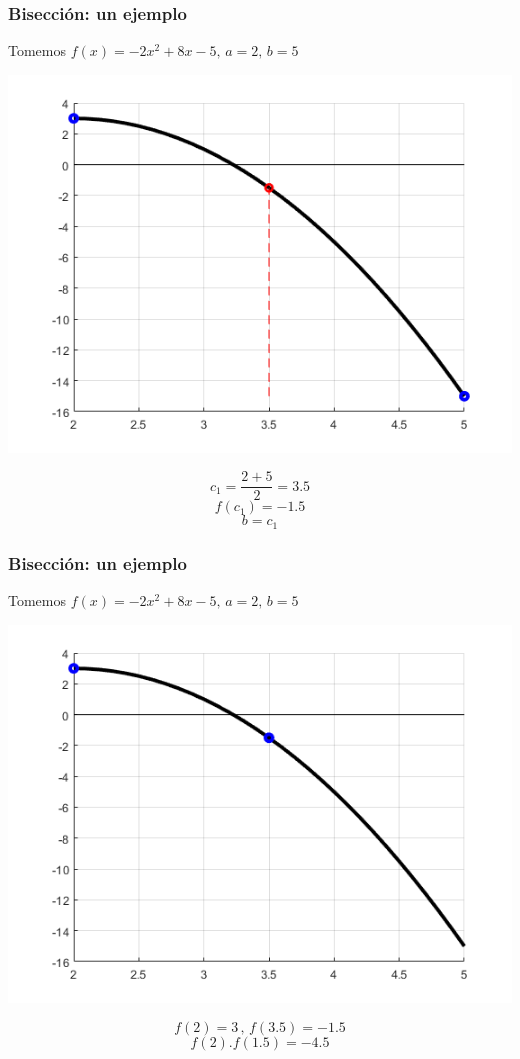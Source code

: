 \documentclass[xcolor=svgnames]{beamer} %
\theoremstyle{plain}
\theoremstyle{definition}
\begin{document}
\begin{frame}
\frametitle{Bisección: un ejemplo}
Tomemos $f(x) = -2x^2+8x-5, \, a=2, \, b=5$
\begin{minipage}{.7\linewidth}
\includegraphics[scale=.5]{Biseccion/f1.png} 
\end{minipage}
\begin{minipage}{.25\linewidth}
$$c_1 = \frac{2+5}{2} = 3.5 $$\vspace{7pt}
$$f(c_1) = -1.5 $$\vspace{7pt}
$$ b = c_1$$
\end{minipage}
\end{frame}

\begin{frame}
\frametitle{Bisección: un ejemplo}
Tomemos $f(x) = -2x^2+8x-5, \, a=2, \, b=5$
\begin{minipage}{.7\linewidth}
\includegraphics[scale=.5]{Biseccion/f2.png} 
\end{minipage}
\begin{minipage}{.25\linewidth}
$$f(2)=3 \,,\,f(3.5)=-1.5$$\vspace{7pt}
$$f(2).f(1.5) = -4.5$$\vspace{7pt}

\end{minipage}
\end{frame}
\end{document}
